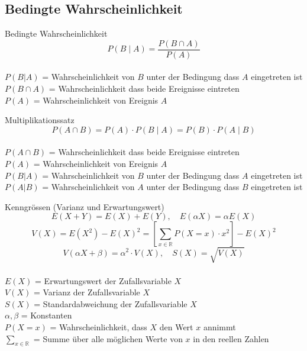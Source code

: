 \subsection{Bedingte Wahrscheinlichkeit}
\begin{definition}{Bedingte Wahrscheinlichkeit}\\
$$
P(B \mid A)=\frac{P(B \cap A)}{P(A)}
$$
\\
$P(B|A)$ = Wahrscheinlichkeit von $B$ unter der Bedingung dass $A$ eingetreten ist\\
$P(B \cap A)$ = Wahrscheinlichkeit dass beide Ereignisse eintreten\\
$P(A)$ = Wahrscheinlichkeit von Ereignis $A$\\
\end{definition}

\begin{theorem}{Multiplikationssatz}\\
$$
P(A \cap B)=P(A) \cdot P(B \mid A)=P(B) \cdot P(A \mid B)
$$
\\
$P(A \cap B)$ = Wahrscheinlichkeit dass beide Ereignisse eintreten\\
$P(A)$ = Wahrscheinlichkeit von Ereignis $A$\\
$P(B|A)$ = Wahrscheinlichkeit von $B$ unter der Bedingung dass $A$ eingetreten ist\\
$P(A|B)$ = Wahrscheinlichkeit von $A$ unter der Bedingung dass $B$ eingetreten ist\\
\end{theorem}
\begin{concept}{Kenngrössen (Varianz und Erwartungswert)}\\
$$E(X + Y) = E(X) + E(Y), \quad E(\alpha X) = \alpha E(X)$$
$$V(X) = E(X^2) - E(X)^2 = \left[\sum_{x\in\mathbb{R}} P(X = x) \cdot x^2\right] - E(X)^2$$
$$V(\alpha X + \beta) = \alpha^2 \cdot V(X), \quad S(X) = \sqrt{V(X)}$$
\\
$E(X)$ = Erwartungswert der Zufallsvariable $X$\\
$V(X)$ = Varianz der Zufallsvariable $X$\\
$S(X)$ = Standardabweichung der Zufallsvariable $X$\\
$\alpha, \beta$ = Konstanten\\
$P(X = x)$ = Wahrscheinlichkeit, dass $X$ den Wert $x$ annimmt\\
$\sum_{x\in\mathbb{R}}$ = Summe über alle möglichen Werte von $x$ in den reellen Zahlen\\
\end{concept}
